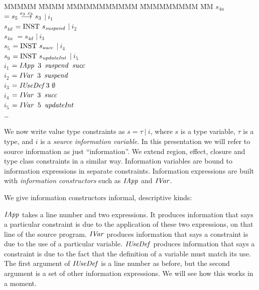 \begin{tabbing}
MMMMM	\= MMMM 		\= MMMMMMMMMMM 		\= MMMMMMMMM		\= MM \kill
	\> $s_{4u}$	\> $= s_5 \stackrel{e_3 \ c_3}{\longrightarrow} s_3$		\> $| \ i_1$ 
	\\[0.5ex]
	\> $s_{4d}$ 	\> $= \textrm{INST} \ s_{\operatorname{\mathit{suspend}}}$ 			\> $| \ i_2$
	\\[0.5ex]
	\> $s_{4u}$	\> $= s_{4d}$					\> $| \ i_3$
	\\[0.5ex]
	\> $s_5$	\> $= \textrm{INST} \ s_{\operatorname{\mathit{succ}}}$			\> $| \ i_4$
	\\[0.5ex]
	\> $s_9$	\> $= \textrm{INST} \ s_{\operatorname{\mathit{updateInt}}}$			\> $| \ i_5$
	\\[0.5ex]
	\> $i_1$	\> $= \iIApp \ 3 \ \isuspend \ \isucc$ 
	\\
	\> $i_2$	\> $= \operatorname{\mathit{IVar}} \ 3 \ \operatorname{\mathit{suspend}}$
	\\
	\> $i_3$	\> $= \operatorname{\mathit{IUseDef}} 3 \ \emptyset$
	\\
	\> $i_4$	\> $= \operatorname{\mathit{IVar}} \ 3 \ \operatorname{\mathit{succ}}$
	\\
	\> $i_5$	\> $= \operatorname{\mathit{IVar}} \ 5 \ \operatorname{\mathit{updateInt}}$
	\\
	\> \dots
\end{tabbing}

We now write value type constraints as $s = \tau \ | \ i$, where $s$ is a type variable, $\tau$ is a type, and $i$ is a \emph{source information variable}. In this presentation we will refer to source information as just ``information''. We extend region, effect, closure and type class constraints in a similar way. Information variables are bound to information expressions in separate constraints. Information expressions are built with \emph{information constructors} such as $\operatorname{\mathit{IApp}}$ and $\operatorname{\mathit{IVar}}$. 

We give information constructors informal, descriptive kinds:


$\operatorname{\mathit{IApp}}$ takes a line number and two expressions. It produces information that says a particular constraint is due to the application of these two expressions, on that line of the source program. $\operatorname{\mathit{IVar}}$ produces information that says a constraint is due to the use of a particular variable. $\operatorname{\mathit{IUseDef}}$ produces information that says a constraint is due to the fact that the definition of a variable must match its use. The first argument of $\operatorname{\mathit{IUseDef}}$ is a line number as before, but the second argument is a set of other information expressions. We will see how this works in a moment. 

